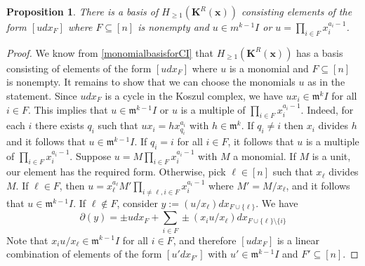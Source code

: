 \documentclass[10pt,reqno]{amsart}
\newtheorem{proposition}[subsection]{Proposition}
\theoremstyle{definition}
\theoremstyle{remark}
\numberwithin{equation}{section}
\newcommand{\m}{\mathfrak m}
\numberwithin{equation}{section}
\begin{document}
\begin{proposition}\label{basischoice}
     There is a basis of $H_{\geq 1}(\mathbf{K}^R(\mathbf{x}))$ consisting elements of the form  $[udx_F]$ where $F\subseteq [n]$ is nonempty and $u\in m^{k-1}I$
     or $u=\prod_{i\in F} x_i^{a_i-1}$.        
\end{proposition}
\begin{proof}
    
    We know from \cref{monomialbasisforCI}  that $H_{\geq 1}(\mathbf{K}^R(\mathbf{x}))$ has a basis consisting of elements of the form $[udx_{F}]$ where $u$ is a monomial and $F\subseteq [n]$ is nonempty. It remains to show that we can choose the monomials $u$ as in the statement. Since $udx_F$ is a cycle in the Koszul complex, we have $ux_i\in \m^kI$ for all $i\in F$. 
    This implies that $u\in \m^{k-1}I$ or $u$ is a multiple of $\prod_{i\in F}x_i^{a_i-1}$.
    Indeed, for each $i$ there exists $q_i$ such that $ux_i=hx_{q_i}^{a_i}$ with $h\in \m^k$. If $q_i\ne i$ then $x_i$ divides $h$ and it follows that $u\in \m^{k-1}I$. If $q_i=i$ for all $i\in F$, it follows that $u$ is a multiple of $\prod_{i\in F}x_i^{a_i-1}.$
    Suppose $u=M\prod_{i\in F} x_i^{a_i-1}$ with $M$ a monomial. If $M$ is a unit, our element has the required form.  Otherwise, pick $\ell \in [n]$ such that $x_{\ell}$ divides $M$. If $\ell \in F$, then $u=x_{\ell}^{a_\ell} M'\prod_{i\ne \ell, i\in F} x_i^{a_i-1}$ where $M'=M/x_{\ell}$, and it follows that $u\in \m^{k-1}I$. If $\ell \notin F$, 
    consider $y:=(u/x_{\ell})dx_{F\cup \{\ell\}}$. We have 
    \[
    \partial(y)=\pm udx_F+\sum_{i\in F}\pm (x_iu/x_{\ell})dx_{F\cup \{\ell\}\setminus \{i\}} 
    \]
    Note that $x_iu/x_{\ell} \in \m^{k-1}I$ for all $i\in F$, and therefore $[udx_F]$ is a linear combination of elements of the form $[u'dx_{F'}]$ with $u'\in \m^{k-1}I$ and $F'\subseteq [n]$.
    

    
    

\end{proof}
\end{document}
